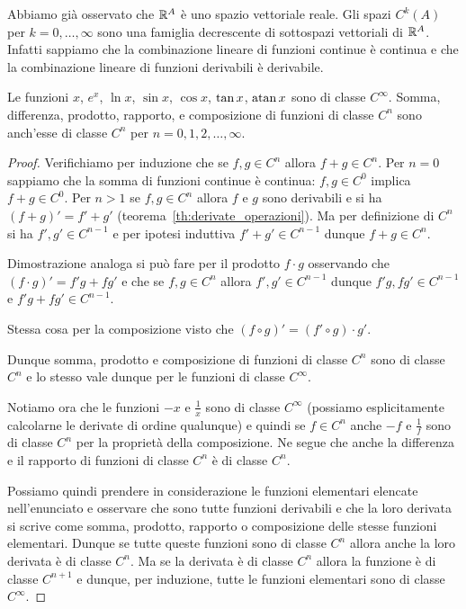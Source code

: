 Abbiamo già osservato che ${\mathbb R}^A$ è uno spazio vettoriale reale.
Gli spazi $C^k(A)$ per $k=0, \dots, \infty$ sono una famiglia decrescente di sottospazi vettoriali di ${\mathbb R}^A$.
Infatti sappiamo che la combinazione lineare di funzioni continue è continua e che la combinazione lineare di funzioni derivabili è derivabile.

\begin{theorem}
Le funzioni $x$, $e^x$, $\ln x$, $\sin x$, $\cos x$, $\operatorname{tan} x$, $\operatorname{atan} x$ 
sono di classe $C^\infty$. 
Somma, differenza, prodotto, rapporto, e composizione di funzioni di classe $C^n$ 
sono anch'esse di classe $C^n$ per $n=0,1,2,\dots,\infty$.
\end{theorem}
\begin{proof}
Verifichiamo per induzione che se $f,g \in C^n$ allora $f+g \in C^n$.
Per $n=0$ sappiamo che la somma di funzioni continue è continua: $f,g\in C^0$ implica $f+g\in C^0$.
Per $n>1$ se $f,g\in C^n$ allora $f$ e $g$ sono derivabili e si ha 
$(f+g)'=f'+g'$ (teorema~\ref{th:derivate_operazioni}).
Ma per definizione di $C^n$ si ha $f',g'\in C^{n-1}$ e per ipotesi induttiva 
$f'+g'\in C^{n-1}$ dunque $f+g\in C^n$.

Dimostrazione analoga si può fare per il prodotto $f\cdot g$ osservando 
che $(f\cdot g)' = f'g + fg'$ e che se $f,g\in C^n$ allora $f',g'\in C^{n-1}$ 
dunque $f'g,fg'\in C^{n-1}$ e $f'g+fg'\in C^{n-1}$.

Stessa cosa per la composizione visto che $(f\circ g)' = (f'\circ g)\cdot g'$.

Dunque somma, prodotto e composizione di funzioni di classe $C^n$ sono di classe $C^n$
e lo stesso vale dunque per le funzioni di classe $C^\infty$.

Notiamo ora che le funzioni $-x$ e $\frac 1 x$ sono di classe $C^\infty$
(possiamo esplicitamente calcolarne le derivate di ordine qualunque) e quindi 
se $f\in C^n$ anche $-f$ e $\frac 1 f$ sono di classe $C^n$ per la proprietà della 
composizione. 
Ne segue che anche la differenza e il rapporto di funzioni di classe $C^n$   
è di classe $C^n$.

Possiamo quindi prendere in considerazione le funzioni elementari elencate nell'enunciato 
e osservare che sono tutte funzioni derivabili e che la loro derivata si scrive 
come somma, prodotto, rapporto o composizione delle stesse funzioni elementari.
Dunque se tutte queste funzioni sono di classe $C^n$ allora anche la loro derivata 
è di classe $C^n$. 
Ma se la derivata è di classe $C^n$ allora la funzione è di classe $C^{n+1}$
e dunque, per induzione, tutte le funzioni elementari sono di classe $C^\infty$.
\end{proof}

